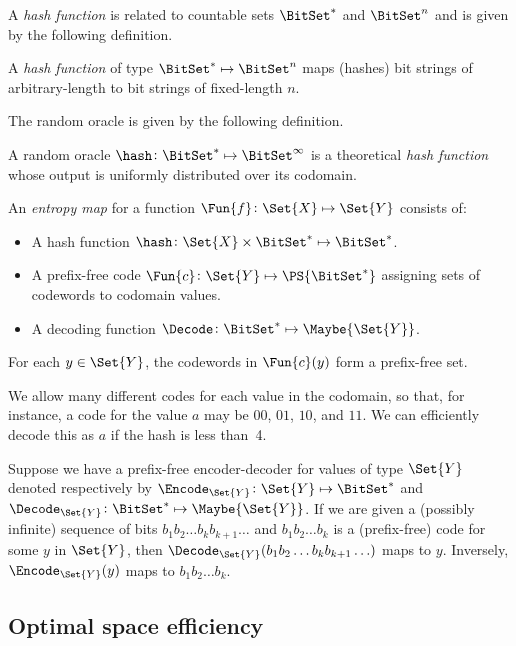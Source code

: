 \documentclass[ ../main.tex]{subfiles}
\begin{document}
A \emph{hash function} is related to countable sets $\BitSet^*$ and $\BitSet^n$ and is given by the following definition.
\begin{definition}
A \emph{hash function} of type $\BitSet^* \mapsto \BitSet^n$ maps (hashes) bit strings of arbitrary-length to bit strings of fixed-length $n$.
\end{definition}

The random oracle is given by the following definition.
\begin{definition}
\label{def:randomoracle}
A random oracle $\hash \colon \BitSet^* \mapsto \BitSet^{\infty}$ is a theoretical \emph{hash function} whose output is uniformly distributed over its codomain.
\end{definition}

\begin{definition}
\label{def:entropy-map}
An \emph{entropy map} for a function $\Fun{f} \colon \Set{X} \mapsto \Set{Y}$
consists of:
\begin{itemize}
\item A hash function $\hash \colon \Set{X} \times \BitSet^{*} \mapsto \BitSet^{*}$.
\item A prefix-free code $\Fun{c} \colon \Set{Y} \mapsto \PS{\BitSet^{*}}$
      assigning sets of codewords to codomain values.
\item A decoding function $\Decode \colon \BitSet^{*} \mapsto \Maybe{\Set{Y}}$.
\end{itemize}
For each $y \in \Set{Y}$, the codewords in $\Fun{c}(y)$ form a prefix-free set.
\end{definition}

We allow many different codes for each value in the codomain, so that, for
instance, a code for the value $a$ may be $00$, $01$, $10$, and $11$.
We can efficiently decode this as $a$ if the hash is less than~4.

Suppose we have a prefix-free encoder-decoder for values of type $\Set{Y}$ denoted respectively by $\Encode_{\Set{Y}} \colon \Set{Y} \mapsto \BitSet^*$ and $\Decode_{\Set{Y}} \colon \BitSet^* \mapsto \Maybe{\Set{Y}}$.
If we are given a (possibly infinite) sequence of bits $b_1 b_2 \ldots b_k b_{k+1} \ldots$ and $b_1 b_2 \ldots b_k$ is a (prefix-free) code for some $y$ in $\Set{Y}$, then $\Decode_{\Set{Y}}(b_1 b_2 \ldots b_k b_{k+1} \ldots)$ maps to $y$.
Inversely, $\Encode_{\Set{Y}}(y)$ maps to $b_1 b_2 \ldots b_k$.

\subsection{Optimal space efficiency}
\end{document}
